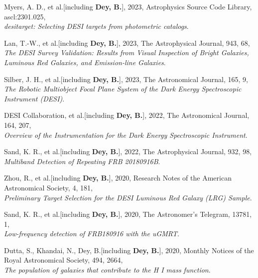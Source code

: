 \item Myers, A. D., et al.[including \textbf{Dey, B.}], 2023, Astrophysics Source Code Library, ascl:2301.025, \\ \textit{desitarget: Selecting DESI targets from photometric catalogs}. 
 

\item Lan, T.-W., et al.[including \textbf{Dey, B.}], 2023, The Astrophysical Journal, 943, 68, \\ \textit{The DESI Survey Validation: Results from Visual Inspection of Bright Galaxies, Luminous Red Galaxies, and Emission-line Galaxies}. 
 

\item Silber, J. H., et al.[including \textbf{Dey, B.}], 2023, The Astronomical Journal, 165, 9, \\ \textit{The Robotic Multiobject Focal Plane System of the Dark Energy Spectroscopic Instrument (DESI)}. 
 

\item DESI Collaboration, et al.[including \textbf{Dey, B.}], 2022, The Astronomical Journal, 164, 207, \\ \textit{Overview of the Instrumentation for the Dark Energy Spectroscopic Instrument}. 
 
\item Sand, K. R., et al.[including \textbf{Dey, B.}], 2022, The Astrophysical Journal, 932, 98, \\ \textit{Multiband Detection of Repeating FRB 20180916B}. 
 
\item Zhou, R., et al.[including \textbf{Dey, B.}], 2020, Research Notes of the American Astronomical Society, 4, 181, \\ \textit{Preliminary Target Selection for the DESI Luminous Red Galaxy (LRG) Sample}. 
 

\item Sand, K. R., et al.[including \textbf{Dey, B.}], 2020, The Astronomer's Telegram, 13781, 1, \\ \textit{Low-frequency detection of FRB180916 with the uGMRT}. 
 

\item Dutta, S., Khandai, N., Dey, B.[including \textbf{Dey, B.}], 2020, Monthly Notices of the Royal Astronomical Society, 494, 2664, \\ \textit{The population of galaxies that contribute to the H I mass function}. 
